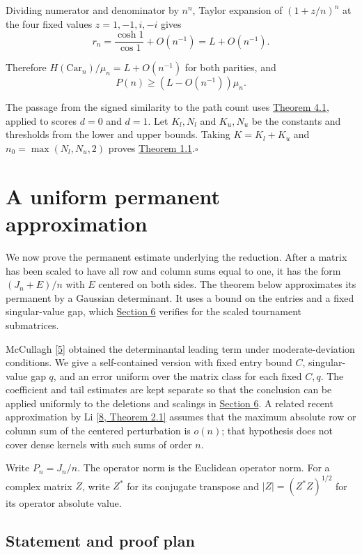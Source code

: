 \documentclass[11pt,a4paper]{article}
\newcommand{\paperref}[2]{\hyperref[#1]{#2}}
\begin{document}
Dividing numerator and denominator by \(n^n\), Taylor expansion of \((1+z/n)^n\) at the four fixed values \(z=1,-1,i,-i\) gives
\[r_n=\frac{\cosh1}{\cos1}+O(n^{-1})=L+O(n^{-1}).\]

Therefore \(H(\mathrm{Car}_n)/\mu_n=L+O(n^{-1})\) for both parities, and
\[P(n)\ge(L-O(n^{-1}))\mu_n.\]

The passage from the signed similarity to the path count uses \paperref{thm-4.1}{Theorem 4.1}, applied to scores \(d=0\) and \(d=1\). Let \(K_l,N_l\) and \(K_u,N_u\) be the constants and thresholds from the lower and upper bounds. Taking \(K=K_l+K_u\) and \(n_0=\max(N_l,N_u,2)\) proves \paperref{thm-1.1}{Theorem 1.1}.\nobreak\hspace{.5em}\mbox{$\square$}

\section{A uniform permanent approximation}\label{sec-5}

We now prove the permanent estimate underlying the reduction. After a matrix has been scaled to have all row and column sums equal to one, it has the form \((J_n+E)/n\) with \(E\) centered on both sides. The theorem below approximates its permanent by a Gaussian determinant. It uses a bound on the entries and a fixed singular-value gap, which \paperref{sec-6}{Section 6} verifies for the scaled tournament submatrices.

McCullagh \paperref{bib-5}{[5]} obtained the determinantal leading term under moderate-deviation conditions. We give a self-contained version with fixed entry bound \(C\), singular-value gap \(q\), and an error uniform over the matrix class for each fixed \(C,q\). The coefficient and tail estimates are kept separate so that the conclusion can be applied uniformly to the deletions and scalings in \paperref{sec-6}{Section 6}. A related recent approximation by Li \paperref{bib-8}{[8, Theorem 2.1]} assumes that the maximum absolute row or column sum of the centered perturbation is \(o(n)\); that hypothesis does not cover dense kernels with such sums of order \(n\).

Write \(P_n=J_n/n\). The operator norm is the Euclidean operator norm. For a complex matrix \(Z\), write \(Z^*\) for its conjugate transpose and \(|Z|=(Z^*Z)^{1/2}\) for its operator absolute value.

\subsection{Statement and proof plan}\label{sec-5.1}
\end{document}
